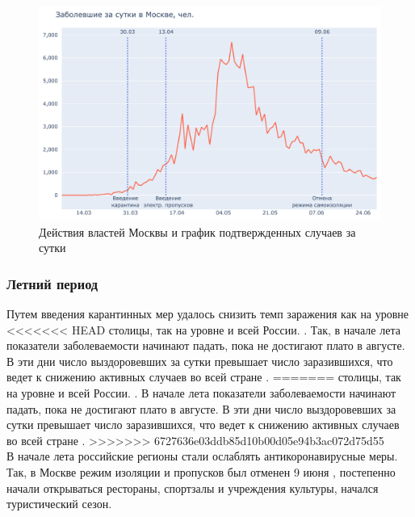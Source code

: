 \documentclass[a4paper, 12pt]{extarticle}
\begin{document}
\begin{figure}[h]
    \centering
    \includegraphics[scale=0.55]{../plots/7daily_confirmed_with_events_moscow_1.pdf}
    \caption{Действия властей Москвы и график подтвержденных случаев за сутки}
    \label{fig:day_confirmed_moscow_with_events1}
\end{figure}

\subsubsection{Летний период}
Путем введения карантинных мер удалось снизить темп заражения как на уровне
<<<<<<< HEAD
столицы, так на уровне и всей России. . Так, в начале лета показатели
заболеваемости начинают падать, пока не достигают плато в августе. В эти дни
число выздоровевших за сутки превышает число заразившихся, что ведет к снижению
активных случаев во всей стране .
=======
столицы, так на уровне и всей России. . В начале лета показатели заболеваемости начинают падать, пока не достигают плато в августе. В эти дни число выздоровевших за сутки превышает число заразившихся, что ведет к снижению активных случаев во всей стране .
>>>>>>> 6727636e03ddb85d10b00d05e94b3ac072d75d55
\\

В начале лета российские регионы стали ослаблять антикоронавирусные меры. Так,
в Москве режим изоляции и пропусков был отменен 9 июня
, постепенно начали
открываться рестораны, спортзалы и учреждения культуры, начался туристический
сезон.
\\
\end{document}
